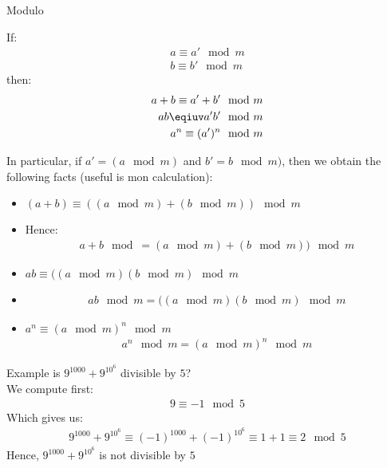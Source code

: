     \begin{parag}{Modulo}
        \begin{theoreme}
            If:
            \begin{align*}
                a \equiv a' \mod m\\
                b \equiv b' \mod m 
            \end{align*}
            then:
            \begin{align*}
                a + b \equiv a' + b' \mod m\\
                ab \eqiuv a'b' \mod m\\
                a^n \equiv (a')^n \mod m
            \end{align*}
        \end{theoreme}
        In particular, if $a' = ( a \mod m)$ and $b' = b \mod m)$, then we obtain the following facts (useful is mon calculation):
        \begin{itemize}
            \item $(a + b) \equiv ((a \mod m) + (b \mod m)) \mod m$
            \item Hence:
                \begin{align*}
                    a + b \mod = (a \mod m) + (b \mod m)) \mod m
                \end{align*}
            \item $ab \equiv ((a \mod m) (b \mod m) \mod m$
            \item \begin{align*}
                ab \mod m = ((a \mod m)(b \mod m) \mod m
            \end{align*}
        \item $a^n \equiv (a \mod m)^n \mod m$
            \begin{align*}
                a^n \mod m = (a \mod m)^n \mod m
            \end{align*}
        \end{itemize}
        
        \begin{subparag}{Example}
            is $9^{1000} + 9^{10^6}$ divisible by $5$?\\
            We compute first:
            \begin{align*}
                9 \equiv -1 \mod 5
            \end{align*}
            Which gives us:
            \begin{align*}
                9^{1000} + 9^{10^6} \equiv (-1)^{1000} + (-1)^{10^6} \equiv 1 + 1 \equiv 2 \mod 5 
            \end{align*}
            Hence, $9^{1000} + 9^{10^6}$ is not divisible by $5$
        \end{subparag}
    \end{parag}
